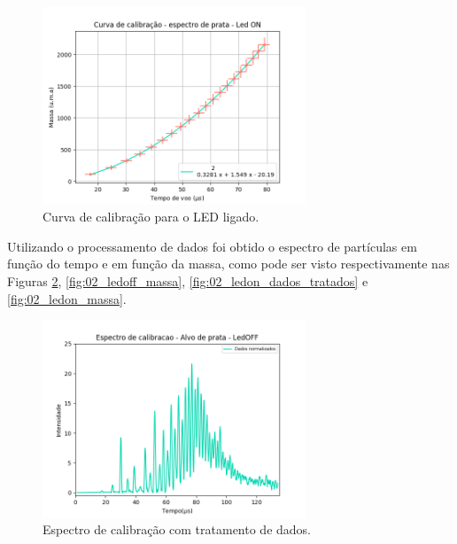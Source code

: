 \begin{figure}
  \centering  
  \includegraphics[width=0.7\textwidth]{exp_02/LEDON_curv+erro_calib.png}
  \caption{Curva de calibração para o LED ligado.}
  \label{fig:02_calib_ledON} 
\end{figure}



Utilizando o processamento de dados foi obtido o espectro de partículas em função do tempo e em função da massa, como pode ser visto respectivamente nas Figuras \ref{fig:02_ledoff_dados_tratados}, \ref{fig:02_ledoff_massa}, \ref{fig:02_ledon_dados_tratados} e \ref{fig:02_ledon_massa}.

\begin{figure}
  \centering  
  \includegraphics[width=0.7\textwidth]{exp_02/LEDOFF_normalizado_mcp.png}
  \caption{Espectro de calibração com tratamento de dados.}
  \label{fig:02_ledoff_dados_tratados} 
\end{figure}

